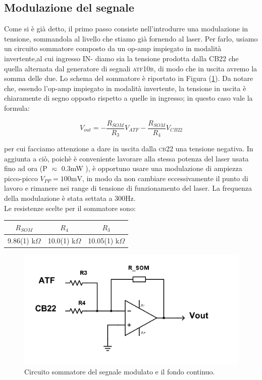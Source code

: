 \documentclass[10pt,letterpaper]{article}
\begin{document}
\subsection{Modulazione del segnale}
Come si è già detto, il primo passo consiste nell'introdurre una modulazione in tensione, sommandola al livello che stiamo già fornendo al laser. Per farlo, usiamo un circuito sommatore composto da un op-amp impiegato in modalità invertente,al cui ingresso \textsc{IN}- diamo sia la tensione prodotta dalla \textsc{CB22} che quella alternata dal generatore di segnali \textsc{atf10b}, di modo che in uscita avremo la somma delle due. Lo schema del sommatore è riportato in Figura (\ref{fig:sommatore}). Da notare che, essendo l'op-amp impiegato in modalità invertente, la tensione in uscita è chiaramente di segno opposto rispetto a quelle in ingresso; in questo caso vale la formula:

\begin{equation}
V_{out} = - \frac{R_{SOM}}{R_3}V_{ATF} - \frac{R_{SOM}}{R_4}V_{CB22}
\end{equation}   

per cui facciamo attenzione a dare in uscita dalla \textsc{cb22} una tensione negativa. In aggiunta a ciò, poichè è conveniente lavorare alla stessa potenza del laser usata fino ad ora (P $\eqsim$ 0.3mW ), è opportuno usare una modulazione di ampiezza picco-picco $V_{PP} = 100 \mathrm{mV}$, in modo da non cambiare eccessivamente il punto di lavoro e rimanere nei range di tensione di funzionamento del laser. La frequenza della modulazione è stata settata a 300Hz.\\
Le resistenze scelte per il sommatore sono:\\

\begin{table}[h]
\centering
\begin{tabular}{c|c|c}
\hline $R_{SOM}$ & $R_4$ & $R_3$ \\ 
\hline 9.86(1) k$\Omega$ & 10.0(1) k$\Omega$ & 10.05(1) k$\Omega$ \\ 
\end{tabular}
\end{table}  

\begin{figure}
\centering
\includegraphics[width=0.7\linewidth]{./sommatore}
\caption{Circuito sommatore del segnale modulato e il fondo continuo.}
\label{fig:sommatore}
\end{figure}
\end{document}
